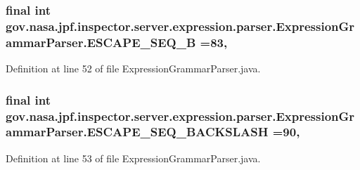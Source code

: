 \subsubsection[{\texorpdfstring{E\+S\+C\+A\+P\+E\+\_\+\+S\+E\+Q\+\_\+B}{ESCAPE_SEQ_B}}]{\setlength{\rightskip}{0pt plus 5cm}final int gov.\+nasa.\+jpf.\+inspector.\+server.\+expression.\+parser.\+Expression\+Grammar\+Parser.\+E\+S\+C\+A\+P\+E\+\_\+\+S\+E\+Q\+\_\+B =83\hspace{0.3cm}{\ttfamily [static]}, {\ttfamily [package]}}\hypertarget{classgov_1_1nasa_1_1jpf_1_1inspector_1_1server_1_1expression_1_1parser_1_1_expression_grammar_parser_aed90bdc398fe8acfcdd3813a89c57c3f}{}\label{classgov_1_1nasa_1_1jpf_1_1inspector_1_1server_1_1expression_1_1parser_1_1_expression_grammar_parser_aed90bdc398fe8acfcdd3813a89c57c3f}


Definition at line 52 of file Expression\+Grammar\+Parser.\+java.

\subsubsection[{\texorpdfstring{E\+S\+C\+A\+P\+E\+\_\+\+S\+E\+Q\+\_\+\+B\+A\+C\+K\+S\+L\+A\+SH}{ESCAPE_SEQ_BACKSLASH}}]{\setlength{\rightskip}{0pt plus 5cm}final int gov.\+nasa.\+jpf.\+inspector.\+server.\+expression.\+parser.\+Expression\+Grammar\+Parser.\+E\+S\+C\+A\+P\+E\+\_\+\+S\+E\+Q\+\_\+\+B\+A\+C\+K\+S\+L\+A\+SH =90\hspace{0.3cm}{\ttfamily [static]}, {\ttfamily [package]}}\hypertarget{classgov_1_1nasa_1_1jpf_1_1inspector_1_1server_1_1expression_1_1parser_1_1_expression_grammar_parser_ac71e949b36bdaf43df235fa65eca61f5}{}\label{classgov_1_1nasa_1_1jpf_1_1inspector_1_1server_1_1expression_1_1parser_1_1_expression_grammar_parser_ac71e949b36bdaf43df235fa65eca61f5}


Definition at line 53 of file Expression\+Grammar\+Parser.\+java.

